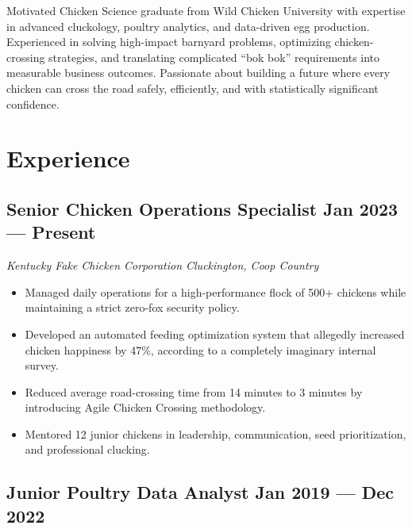 \documentclass[10pt]{article}
\newcommand{\subtext}[1]{
    \textit{#1}\par\vspace{-.5em}
}
\newenvironment{zitemize}
{
    \begin{itemize}
        \itemsep 0pt
        \parskip 0pt
        \parsep 1pt
}
{
    \end{itemize}
    \vspace{-.5em}
}
\begin{document}
\pagestyle{others}
\thispagestyle{first_page}


Motivated Chicken Science graduate from Wild Chicken University with
expertise in advanced cluckology, poultry analytics, and data-driven
egg production. Experienced in solving high-impact barnyard problems,
optimizing chicken-crossing strategies, and translating complicated
``bok bok'' requirements into measurable business outcomes. Passionate
about building a future where every chicken can cross the road safely,
efficiently, and with statistically significant confidence.


\section{Experience}

\subsection{Senior Chicken Operations Specialist \hfill Jan 2023 --- Present}

\subtext{Kentucky Fake Chicken Corporation \hfill Cluckington, Coop Country}

\begin{zitemize}
    \item Managed daily operations for a high-performance flock of
    500+ chickens while maintaining a strict zero-fox security policy.

    \item Developed an automated feeding optimization system that
    allegedly increased chicken happiness by 47\%, according to a
    completely imaginary internal survey.

    \item Reduced average road-crossing time from 14 minutes to
    3 minutes by introducing Agile Chicken Crossing methodology.

    \item Mentored 12 junior chickens in leadership, communication,
    seed prioritization, and professional clucking.
\end{zitemize}

\subsection{Junior Poultry Data Analyst \hfill Jan 2019 --- Dec 2022}
\end{document}
